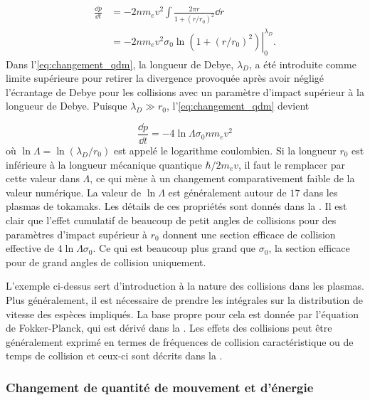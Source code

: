 \documentclass[main.tex]{subfiles}
\begin{document}
\begin{align}
	\frac{\dd p}{\dd t} &= - 2 n m_e v^2 \int \frac{2 \pi r}{1 + \left(r/r_0 \right)^2} \dd r \nonumber\\
	&= \left. - 2 n m_e v^2 \sigma_0 \ln \left( 1 + \left( r / r_0 \right)^2 \right)\right\vert_0^{\lambda_D}.
	\label{eq:changement_qdm}
\end{align}
Dans l'\autoref{eq:changement_qdm}, la longueur de Debye, \( \lambda_D \), a été introduite comme limite supérieure pour retirer la divergence provoquée après avoir négligé l'écrantage de Debye pour les collisions avec un paramètre d'impact supérieur à la longueur de Debye.
Puisque \( \lambda_D \gg r_0 \), l'\autoref{eq:changement_qdm} devient

\begin{equation}
	\frac{\dd p}{\dd t} = - 4 \ln \Lambda \sigma_0 n m_e v^2
	\label{eq:changement_qdm_2}
\end{equation}
où \( \ln \Lambda = \ln \left( \lambda_D/r_0\right) \) est appelé le logarithme coulombien.
Si la longueur \( r_0 \) est inférieure à la longueur mécanique quantique \( \hbar / 2 m_e v \), il faut le remplacer par cette valeur dans \( \Lambda \), ce qui mène à un changement comparativement faible de la valeur numérique.
La valeur de \( \ln \Lambda \) est généralement autour de \( 17 \) dans les plasmas de tokamaks.
Les détails de ces propriétés sont donnés dans la \color{red}{Section 14.5 (lien à rajouter quand elle sera faite)}\color{black}.
Il est clair que l'effet cumulatif de beaucoup de petit angles de collisions pour des paramètres d'impact supérieur à \( r_0 \) donnent une section efficace de collision effective de \( 4 \ln \Lambda \sigma_0 \).
Ce qui est beaucoup plus grand que \( \sigma_0 \), la section efficace pour de grand angles de collision uniquement.

L'exemple ci-dessus sert d'introduction à la nature des collisions dans les plasmas.
Plus généralement, il est nécessaire de prendre les intégrales sur la distribution de vitesse des espèces impliqués.
La base propre pour cela est donnée par l'équation de Fokker-Planck, qui est dérivé dans la \color{red}{Section 2.10 (lien à rajouter quand elle sera faite)}\color{black}.
Les effets des collisions peut être généralement exprimé en termes de fréquences de collision caractéristique ou de temps de collision et ceux-ci sont décrits dans la \color{red}{Section 2.14 (lien à rajouter quand elle sera faite)}\color{black}.

\subsubsection*{Changement de quantité de mouvement et d'énergie}
\end{document}
